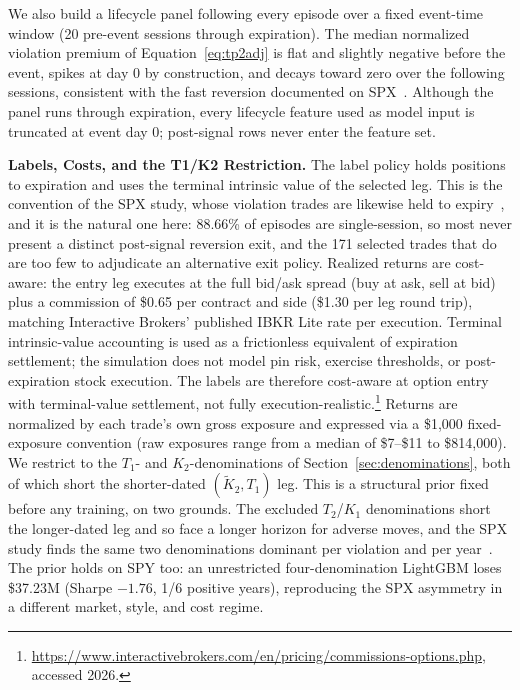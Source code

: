 \documentclass[sigconf,review]{acmart}
\begin{document}
We also build a lifecycle panel following every episode over a fixed event-time window (20 pre-event sessions through expiration). The median normalized violation premium of Equation~\eqref{eq:tp2adj} is flat and slightly negative before the event, spikes at day 0 by construction, and decays toward zero over the following sessions, consistent with the fast reversion documented on SPX~\cite{glasserman2025tp2}. Although the panel runs through expiration, every lifecycle feature used as model input is truncated at event day 0; post-signal rows never enter the feature set.

\medskip\noindent\textbf{Labels, Costs, and the T1/K2 Restriction.}
\label{sec:labels}
The label policy holds positions to expiration and uses the terminal intrinsic value of the selected leg. This is the convention of the SPX study, whose violation trades are likewise held to expiry~\cite{glasserman2025tp2}, and it is the natural one here: 88.66\% of episodes are single-session, so most never present a distinct post-signal reversion exit, and the 171 selected trades that do are too few to adjudicate an alternative exit policy.
Realized returns are cost-aware: the entry leg executes at the full bid/ask spread (buy at ask, sell at bid) plus a commission of \$0.65 per contract and side (\$1.30 per leg round trip), matching Interactive Brokers' published IBKR Lite rate per execution. Terminal intrinsic-value accounting is used as a frictionless equivalent of expiration settlement; the simulation does not model pin risk, exercise thresholds, or post-expiration stock execution. The labels are therefore cost-aware at option entry with terminal-value settlement, not fully execution-realistic.\footnote{\url{https://www.interactivebrokers.com/en/pricing/commissions-options.php}, accessed 2026.} Returns are normalized by each trade's own gross exposure and expressed via a \$1{,}000 fixed-exposure convention (raw exposures range from a median of \$7--\$11 to \$814{,}000). We restrict to the $T_1$- and $K_2$-denominations of Section~\ref{sec:denominations}, both of which short the shorter-dated $(\tilde K_2,T_1)$ leg. This is a structural prior fixed before any training, on two grounds. The excluded $T_2$/$K_1$ denominations short the longer-dated leg and so face a longer horizon for adverse moves, and the SPX study finds the same two denominations dominant per violation and per year~\cite{glasserman2025tp2}. The prior holds on SPY too: an unrestricted four-denomination LightGBM loses \$37.23M (Sharpe $-1.76$, 1/6 positive years), reproducing the SPX asymmetry in a different market, style, and cost regime.
\end{document}
